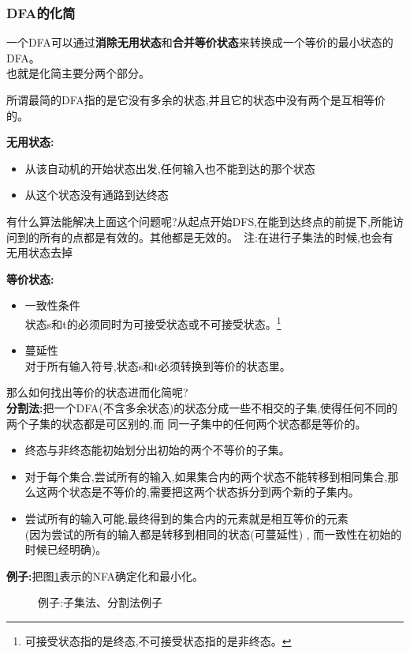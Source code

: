 \subsubsection{DFA的化简}
一个DFA可以通过\textbf{消除无用状态}和\textbf{合并等价状态}来转换成一个等价的最小状态的DFA。\\
也就是化简主要分两个部分。

\spaceline
所谓最简的DFA指的是它没有多余的状态,并且它的状态中没有两个是互相等价的。

\spaceline
\textbf{无用状态:}
\begin{itemize}
 \item 从该自动机的开始状态出发,任何输入也不能到达的那个状态
 \item 从这个状态没有通路到达终态
\end{itemize}
{\color{blue}有什么算法能解决上面这个问题呢?从起点开始DFS,在能到达终点的前提下,所能访问到的所有的点都是有效的。其他都是无效的。\
注:在进行子集法的时候,也会有无用状态去掉}

\spaceline
\textbf{等价状态:}
\begin{itemize}
 \item [(1)] 一致性条件\\
       状态s和t的必须同时为可接受状态或不可接受状态。\footnote{可接受状态指的是终态,不可接受状态指的是非终态。}
 \item [(2)] 蔓延性\\
       对于所有输入符号,状态s和t必须转换到等价的状态里。
\end{itemize}

\spaceline
那么如何找出等价的状态进而化简呢?\\
\textbf{分割法:}把一个DFA(不含多余状态)的状态分成一些不相交的子集,使得任何不同的两个子集的状态都是可区别的,而
同一子集中的任何两个状态都是等价的。

\begin{itemize}
 \item 终态与非终态能初始划分出初始的两个不等价的子集。
 \item 对于每个集合,尝试所有的输入,如果集合内的两个状态不能转移到相同集合,那么这两个状态是不等价的,需要把这两个状态拆分到两个新的子集内。
 \item 尝试所有的输入可能,最终得到的集合内的元素就是相互等价的元素\\
       (因为尝试的所有的输入都是转移到相同的状态(可蔓延性) , 而一致性在初始的时候已经明确)。
\end{itemize}

\spaceline
\textbf{例子:}把图\ref{example-zijifafengefa}表示的NFA确定化和最小化。
\begin{figure}[H]
 \centering
 \caption{例子:子集法、分割法例子}
 \label{example-zijifafengefa}
\end{figure}

